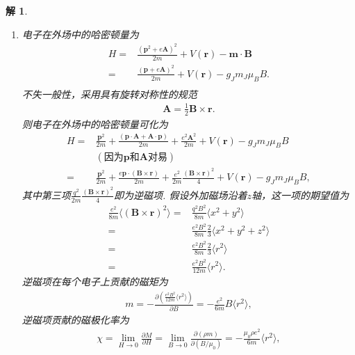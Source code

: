 \documentclass[UTF8,10pt,a4paper]{article}
\theoremstyle{Problem}
\theoremstyle{Solution}
\newtheorem*{sol}{解}
\begin{document}
\begin{sol}
\begin{enumerate}
\begin{align}
        \end{align}
        \item[(b)] 电子在外场中的哈密顿量为
        \begin{align}
            \nonumber H=&\frac{(\bm{p}^2+e\bm{A})^2}{2m}+V(\bm{r})-\bm{m}\cdot\bm{B}\\
            =&\frac{(\bm{p}+e\bm{A})^2}{2m}+V(\bm{r})-g_Jm_J\mu_BB.\\
        \end{align}
        不失一般性，采用具有旋转对称性的规范
        \begin{align}
            \bm{A}=\frac{1}{2}\bm{B}\times\bm{r}.
        \end{align}
        则电子在外场中的哈密顿量可化为
        \begin{align}
            H=&\frac{\bm{p}^2}{2m}+\frac{(\bm{p}\cdot\bm{A}+\bm{A}\cdot\bm{p})}{2m}+\frac{e^2\bm{A}^2}{2m}+V(\bm{r})-g_Jm_J\mu_BB\\
            \nonumber&(\text{因为$\bm{p}$和$\bm{A}$对易})\\
            \nonumber=&\frac{\bm{p}^2}{2m}+\frac{e\bm{p}\cdot(\bm{B}\times\bm{r})}{2m}+\frac{e^2}{2m}\frac{(\bm{B}\times\bm{r})^2}{4}+V(\bm{r})-g_Jm_J\mu_BB,
        \end{align}
        其中第三项$\frac{q^2}{2m}\frac{(\bm{B}\times\bm{r})^2}{4}$即为逆磁项. 假设外加磁场沿着$z$轴，这一项的期望值为
        \begin{align}
            \nonumber\frac{e^2}{8m}\langle(\bm{B}\times\bm{r})^2\rangle=&\frac{q^2B^2}{8m}\langle x^2+y^2\rangle\\
            \nonumber=&\frac{e^2B^2}{8m}\frac{2}{3}\langle x^2+y^2+z^2\rangle\\
            \nonumber=&\frac{e^2B^2}{8m}\frac{2}{3}\langle r^2\rangle\\
            =&\frac{e^2B^2}{12m}\langle r^2\rangle.
        \end{align}
        逆磁项在每个电子上贡献的磁矩为
        \begin{align}
            m=-\frac{\partial\left(\frac{e^2B^2}{12m}\langle r^2\rangle\right)}{\partial B}=-\frac{e^2}{6m}B\langle r^2\rangle,
        \end{align}
        逆磁项贡献的磁极化率为
        \begin{align}
            \chi=\lim_{H\rightarrow 0}\frac{\partial M}{\partial H}=\lim_{B\rightarrow 0}\frac{\partial(\rho m)}{\partial(B/\mu_0)}=-\frac{\mu_0\rho e^2}{6m}\langle r^2\rangle,
        \end{align}

\end{enumerate}
\end{sol}
\end{document}
